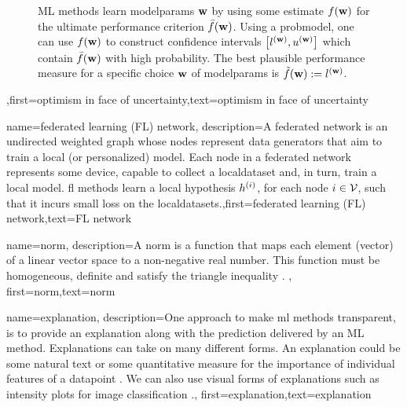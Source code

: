 {{\begin{figure}[htbp]
\begin{center}
\caption{ML methods learn \gls{modelparams} ${\bf w}$ by using some estimate $f({\bf w})$ for 
	the ultimate performance criterion $\bar{f}({\bf w})$. Using a \gls{probmodel}, one can use $f({\bf w})$ to 
	construct confidence intervals $\big[ l^{({\bf w})},  u^{({\bf w})} \big]$ which contain $\bar{f}({\bf w})$  
	with high probability. The best plausible performance measure for a specific choice ${\bf w}$ of \gls{modelparams} 
	is $\tilde{f}({\bf w}) := l^{({\bf w})}$.} 
	\end{center}
		\end{figure}},first={optimism in face of uncertainty},text={optimism in face of uncertainty} 
}

{name={federated learning (FL) network},
	description={A federated network is an undirected weighted \gls{graph} whose 
		nodes represent data generators that aim to train a local (or personalized) \gls{model}. 
		Each node in a federated network represents some device, capable to collect a \gls{localdataset} 
		and, in turn, train a local \gls{model}. 
	    \Gls{fl} methods learn a local \gls{hypothesis} $h^{(i)}$, for 
	    each node $i \in \mathcal{V}$, such that it incurs small \gls{loss} on the \gls{localdataset}s.},first={federated learning (FL) network},text={FL network} 
}

{name={norm},
	description={A norm is a function that maps each element (vector) 
		of a linear vector space to a non-negative real number. This function must be 
		homogeneous, definite and satisfy the triangle inequality \cite{HornMatAnalysis}. },
	first={norm},text={norm} 
}

{name={explanation},
	description={One approach to make \gls{ml} methods transparent, is to provide an 
		explanation along with the \gls{prediction} delivered by an 
		ML method. Explanations can take on many different forms. An explanation 
		could be some natural text or some quantitative measure for the importance 
		of individual \gls{feature}s of a \gls{datapoint} \cite{Molnar2019}. We can also 
		use visual forms of explanations such as intensity plots for image classification \cite{GradCamPaper}.},
	first={explanation},text={explanation} 
}

